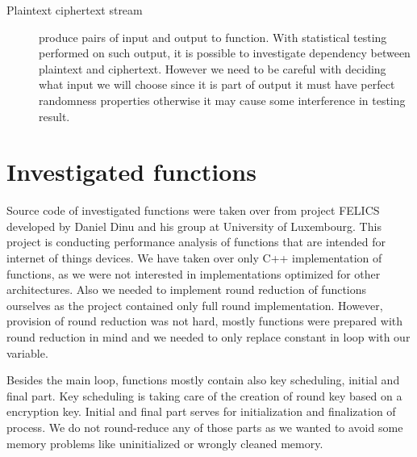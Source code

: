 \documentclass[
    digital,    %
    oneside,    %
    color,
    11pt,
    nocover,
    notable,
    nolof,
    nolot,
    final
]{fithesis3}
\begin{document}
\begin{description}
	\item[Plaintext ciphertext stream] produce pairs of input and output to function. With statistical testing performed on such output, it is possible to investigate dependency between plaintext and ciphertext. However we need to be careful with deciding what input we will choose since it is part of output it must have perfect randomness properties otherwise it may cause some interference in testing result.

\end{description}

\section{Investigated functions}

Source code of investigated functions were taken over from project FELICS~\cite{dinu2015felics} developed by Daniel Dinu and his group at University of Luxembourg. This project is conducting performance analysis of functions that are intended for internet of things devices. We have taken over only C++ implementation of functions, as we were not interested in implementations optimized for other architectures. Also we needed to implement round reduction of functions ourselves as the project contained only full round implementation. However, provision of round reduction was not hard, mostly functions were prepared with round reduction in mind and we needed to only replace constant in loop with our variable. 

Besides the main loop, functions mostly contain also key scheduling, initial and final part. Key scheduling is taking care of the creation of round key based on a encryption key. Initial and final part serves for initialization and finalization of process. We do not round-reduce any of those parts as we wanted to avoid some memory problems like uninitialized or wrongly cleaned memory.
\end{document}
